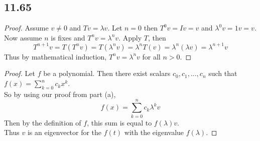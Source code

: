\documentclass{report}
\begin{document}
\subsection{11.65}
\begin{proof}
Assume $v\neq 0$ and $Tv=\lambda v$.
Let $n=0$ then $T^0v=Iv=v$ and $\lambda^0v=1v=v$. Now assume $n$ is fixes and $T^nv=\lambda^nv$. Apply $T$, then 
\[T^{n+1}v=T(T^nv)=T(\lambda^nv)=\lambda^nT(v) = \lambda^n(\lambda v)=\lambda^{n+1}v \]
Thus by mathematical induction, $T^nv=\lambda^nv$ for all $n > 0$.
\end{proof}
\begin{proof}
Let $f$ be a polynomial. Then there exist scalars $c_0,c_1,...,c_n$ such that $f(x)=\sum_{k=0}^nc_kx^k$.\\
So by using our proof from part (a),
\[ f(x)=\sum_{k=0}^nc_k\lambda^kv \]
Then by the definition of $f$, this sum is equal to $f(\lambda)v$.\\
Thus $v$ is an eigenvector for the $f(t)$ with the eigenvalue $f(\lambda)$.
\end{proof}
\end{document}
